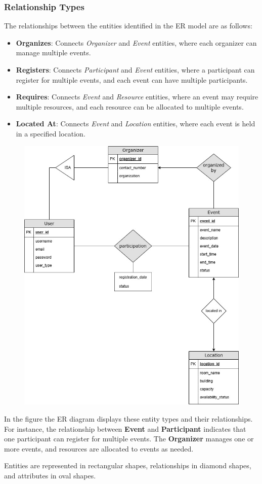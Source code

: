 \subsubsection{Relationship Types}

The relationships between the entities identified in the ER model are as follows:

\begin{itemize}
    \item \textbf{Organizes}: Connects \textit{Organizer} and \textit{Event} entities, where each organizer can manage multiple events.
    \item \textbf{Registers}: Connects \textit{Participant} and \textit{Event} entities, where a participant can register for multiple events, and each event can have multiple participants.
    \item \textbf{Requires}: Connects \textit{Event} and \textit{Resource} entities, where an event may require multiple resources, and each resource can be allocated to multiple events.
    \item \textbf{Located At}: Connects \textit{Event} and \textit{Location} entities, where each event is held in a specified location.
\end{itemize}
\begin{figure}[h]
    \centering
    \includegraphics[scale=0.4]{graphics/Event_Management.jpg}
\end{figure}
In the figure the ER diagram displays these entity types and their relationships. For instance, the relationship between \textbf{Event} and \textbf{Participant} indicates that one participant can register for multiple events. The \textbf{Organizer} manages one or more events, and resources are allocated to events as needed.

Entities are represented in rectangular shapes, relationships in diamond shapes, and attributes in oval shapes.
